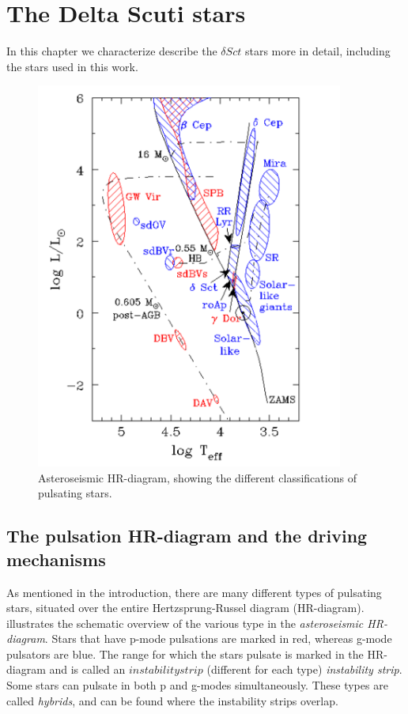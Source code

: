 \chapter{The Delta Scuti stars}
\label{deltascuti}
In this chapter we characterize describe the $\delta Sct$ stars more in detail, including the stars used in this work. 
\begin{figure}[htbp]
    \centering
    \includegraphics[width=0.9\textwidth]{hrpuls.png}
    \caption{Asteroseismic HR-diagram, showing the different classifications of pulsating stars. }
    \label{hrd}
\end{figure}

\section{The pulsation HR-diagram and the driving mechanisms}
As mentioned in the introduction, there are many different types of pulsating stars, situated over the entire Hertzsprung-Russel diagram (HR-diagram).  illustrates the schematic overview of the various type in the \textit{asteroseismic HR-diagram}. Stars that have p-mode pulsations are marked in red, whereas g-mode pulsators are blue. The range for which the stars pulsate is marked in the HR-diagram and is called an $instability strip$ (different for each type)  \textit{instability strip}. Some stars can pulsate in both p and g-modes simultaneously. These types are called \textit{hybrids}, and can be found where the instability strips overlap. 

